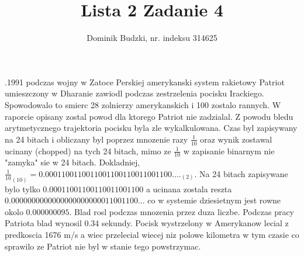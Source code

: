 \documentclass{article}
\title{Lista 2 Zadanie 4}
\author{Dominik Budzki, nr. indeksu 314625}
\begin{document}
.1991 podczas wojny w Zatoce Perskiej amerykanski system rakietowy Patriot umieszczony w Dharanie zawiodl podczas zestrzelenia pocisku Irackiego. Spowodowalo to smierc 28 zolnierzy amerykanskich
i 100 zostalo rannych. W raporcie opisany zostal powod dla ktorego Patriot nie zadzialal. Z powodu bledu arytmetycznego trajektoria pocisku byla zle wykalkulowana. 
Czas byl zapisywany na 24 bitach i obliczany
byl poprzez mnozenie razy $\frac{1}{10}$ oraz wynik zostawal ucinany (chopped) na tych 24 bitach, mimo ze $\frac{1}{10}$ w zapisanie binarnym nie "zamyka" sie w 24 bitach.
Dokladniej, $\frac{1}{10}_{(10)} = 0.0001100110011001100110011001100...._{(2)}$. Na 24 bitach zapisywane bylo tylko $0.00011001100110011001100$ a ucinana zostala reszta $0.0000000000000000000000011001100...$ 
co w systemie dziesietnym jest rowne okolo $0.000000095$.
Blad rosl podczas mnozenia przez duza liczbe. Podczas pracy Patriota blad wynosil 0.34 sekundy. Pocisk wystrzelony w Amerykanow lecial z predkoscia 1676 m/s a wiec
przelecial wiecej niz polowe kilometra w tym czasie co sprawilo ze Patriot nie byl w stanie tego powstrzymac.
\end{document}
